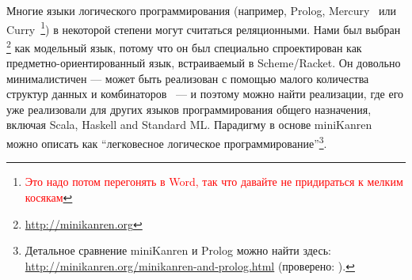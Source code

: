 Многие языки логического программирования (например, Prolog, Mercury~\cite{MercuryFirstPaper} или Curry~\cite{CurryFirstPaper}\footnote{\textcolor{red}{Это надо потом перегонять в Word, так что давайте не придираться к мелким косякам}}) в некоторой степени могут считаться реляционными.
Нами был выбран \miniKanren\footnote{\url{http://minikanren.org}} как модельный язык, потому что он был специально спроектирован как предметно-ориенти\-рованный язык, встраиваемый в Scheme/Racket.
Он довольно минималистичен --- может быть реализован с помощью малого количества структур данных и комбинаторов~\cite{MicroKanren, MuKanrenNew} --- и поэтому можно найти реализации, где его уже реализовали для других языков программирования общего назначения, включая Scala, Haskell and Standard ML.
Парадигму в основе miniKanren можно описать как \enquote{легковесное логическое программирование}\footnote{Детальное сравнение miniKanren и Prolog можно найти здесь: \url{http://minikanren.org/minikanren-and-prolog.html} (проверено: ).}.

